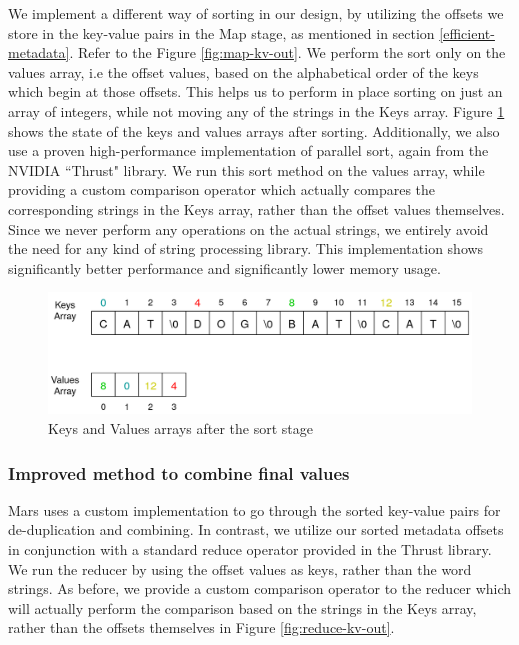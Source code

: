 \documentclass{article}
\begin{document}
We implement a different way of sorting in our design, by utilizing the offsets we store in the key-value pairs in the Map stage, as mentioned in section \ref{efficient-metadata}. Refer to the Figure \ref{fig:map-kv-out}. We perform the sort only on the values array, i.e the offset values, based on the alphabetical order of the keys which begin at those offsets. This helps us to perform in place sorting on just an array of integers, while not moving any of the strings in the Keys array. Figure \ref{fig:map-kv-sorted} shows the state of the keys and values arrays after sorting. Additionally, we also use a proven high-performance implementation of parallel sort, again from the NVIDIA ``Thrust" library.  We run this sort method on the values array, while providing a custom comparison operator which actually compares the corresponding strings in the Keys array, rather than the offset values themselves. Since we never perform any operations on the actual strings, we entirely avoid the need for any kind of string processing library. This implementation shows significantly better performance and significantly lower memory usage.

\begin{figure}[h]
    \centering
    \includegraphics[width=0.9\linewidth]{images/map-kv-sorted.png}
    \caption{Keys and Values arrays after the sort stage}
    \label{fig:map-kv-sorted}
\end{figure}

\subsubsection{Improved method to combine final values}
Mars uses a custom implementation to go through the sorted key-value pairs for de-duplication and combining. In contrast, we utilize our sorted metadata offsets in conjunction with a standard reduce operator provided in the  Thrust library. We run the reducer by using the offset values as keys, rather than the word strings. As before, we provide a custom comparison operator to the reducer which will actually perform the comparison based on the strings in the Keys array, rather than the offsets themselves in Figure \ref{fig:reduce-kv-out}.
\end{document}
